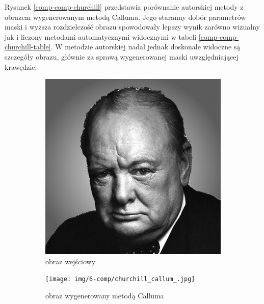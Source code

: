 	Rysunek \ref{comp-comp-churchill} przedstawia porównanie autorskiej metody z obrazem wygenerowanym metodą Calluma. Jego staranny dobór parametrów maski i wyższa rozdzielczość obrazu spowodowały lepszy wynik zarówno wizualny jak i liczony metodami automatycznymi widocznymi w tabeli \ref{comp-comp-churchill-table}. W metodzie autorskiej nadal jednak doskonale widoczne są szczegóły obrazu, głównie za sprawą wygenerowanej maski uwzględniającej krawędzie.
	\begin{figure}[H] 
    \centering
    \begin{subfigure}{0.30\textwidth}
        \centering
        \includegraphics[width = \textwidth]{img/6-comp/churchill_original_c10_inv0.png}
        \caption{obraz wejściowy}
        \label{comp-comp-churchill-a}
    \end{subfigure}
    \begin{subfigure}{0.30\textwidth}
        \centering
        \texttt{[image: img/6-comp/churchill\_callum\_.jpg]}
        \caption{obraz wygenerowany metodą Calluma}
        \label{comp-comp-churchill-b}
    \end{subfigure}\\
    \begin{subfigure}{0.30\textwidth}
        \centering

\end{subfigure}
\end{figure}
